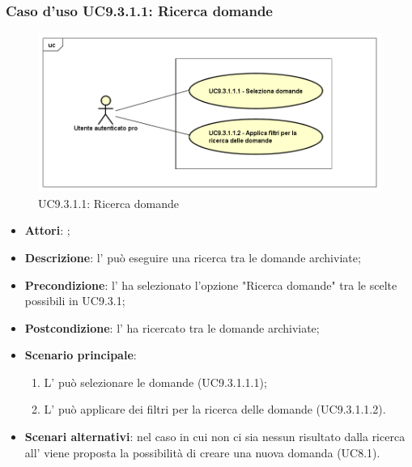 		 \subsubsection{Caso d'uso UC9.3.1.1: Ricerca domande}
		 \label{UC9.3.1.1}
		 \begin{figure}[h]
		 	\centering
		 	\includegraphics[scale=0.5,keepaspectratio]{UML/UC9_3_1_1.png}
		 	\caption{UC9.3.1.1: Ricerca domande}
		 \end{figure}
		 \FloatBarrier
		 \begin{itemize}
		 	\item \textbf{Attori}: \uaupro{};
		 	\item \textbf{Descrizione}: l'\uaupro{} può eseguire una ricerca tra le domande archiviate; 
		 	\item \textbf{Precondizione}: l'\uaupro{} ha selezionato l'opzione "Ricerca domande" tra le scelte possibili in UC9.3.1;
		 	\item \textbf{Postcondizione}: l'\uaupro{} ha ricercato tra le domande archiviate;
		 	\item \textbf{Scenario principale}:
		 	\begin{enumerate}
		 		\item L'\uaupro{} può selezionare le domande (UC9.3.1.1.1); 
		 		\item L'\uaupro{} può applicare dei filtri per la ricerca delle domande (UC9.3.1.1.2).
		 	\end{enumerate}
		 	\item \textbf{Scenari alternativi}: nel caso in cui non ci sia nessun risultato dalla ricerca all'\uaupro{} viene proposta la possibilità di creare una nuova domanda (UC8.1).
		 \end{itemize}
		 
